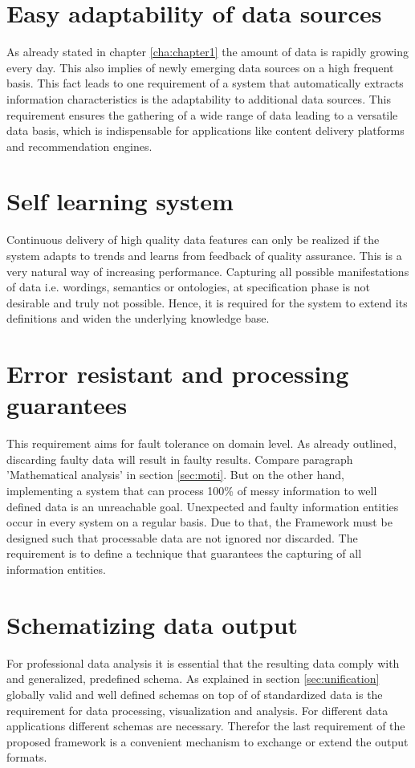 \section{Easy adaptability of data sources}

As already stated in chapter \ref{cha:chapter1} the amount of data is rapidly growing every day. This also implies of newly emerging data sources on a high frequent basis. This fact leads to one requirement of a system that automatically extracts information characteristics is the adaptability to additional data sources. This requirement ensures the gathering of a wide range of data leading to a versatile data basis, which is indispensable for applications like content delivery platforms and recommendation engines.

\section{Self learning system}

Continuous delivery of high quality data features can only be realized if the system adapts to trends and learns from feedback of quality assurance. This is a very natural way of increasing performance. Capturing all possible manifestations of data i.e. wordings, semantics or ontologies, at specification phase is not desirable and truly not possible. Hence, it is required for the system to extend its definitions and widen the underlying knowledge base. 

\section{Error resistant and processing guarantees \label{sec:error}}

This requirement aims for fault tolerance on domain level. As already outlined, discarding faulty data will result in faulty results. Compare paragraph 'Mathematical analysis' in section \ref{sec:moti}. But on the other hand, implementing a system that can process 100\% of messy information to well defined data is an unreachable goal. Unexpected and faulty information entities occur in every system on a regular basis. Due to that, the Framework must be designed such that processable data are not ignored nor discarded. The requirement is to define a technique that guarantees the capturing of all information entities.

\section{Schematizing data output}

For professional data analysis it is essential that the resulting data comply with and generalized, predefined schema. As explained in section \ref{sec:unification} globally valid and well defined schemas on top of of standardized data is the requirement for data processing, visualization and analysis. For different data applications different schemas are necessary. Therefor the last requirement of the proposed framework is a convenient mechanism to exchange or extend the output formats. 








